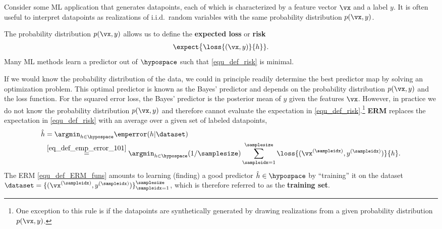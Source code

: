 \documentclass[12pt]{report}
\begin{document}
Consider some ML application that generates datapoints, each of 
which is characterized by a feature vector $\vx$ and a label $y$. It is 
often useful to interpret datapoints as realizations of i.i.d.\ random variables 
with the same probability distribution $p(\vx,y)$. 

The probability distribution $p(\vx,y)$ allows us to define the {\bf expected loss} or {\bf risk} 
\begin{equation}
\label{equ_def_risk} 
\expect \big \{ \loss{(\vx,y)}{h} \}.
\end{equation}
Many ML methods learn a predictor out of $\hypospace$ such 
that \eqref{equ_def_risk} is minimal. 

If we would know the probability distribution of the data, we could 
in principle readily determine the best predictor map by solving an 
optimization problem. This optimal predictor is known as the Bayes' 
predictor and depends on the probability distribution $p(\vx,y)$ 
and the loss function. For the squared error loss, the Bayes' 
predictor is the posterior mean of $y$ given the features $\vx$. 
However, in practice we do not know the probability distribution $p(\vx,y)$ 
and therefore cannot evaluate the expectation in \eqref{equ_def_risk}.\footnote{One exception to this rule is if 
the datapoints are synthetically generated by drawing realizations from a 
given probability distribution $p(\vx,y)$.} 
 {\bf ERM} replaces the expectation in  \eqref{equ_def_risk} with an average 
 over a given set of labeled datapoints,  
\begin{align}
\label{equ_def_ERM_funs}
   \hat{h} & = \argmin_{h \in \hypospace} \emperror(h|\dataset) \nonumber \\ 
   & \stackrel{\eqref{eq_def_emp_error_101}}{=}  \argmin_{h \in \hypospace} (1/\samplesize) \sum_{\sampleidx=1}^{\samplesize} \loss{(\vx^{(\sampleidx)},y^{(\sampleidx)})}{h}.
\end{align}
The ERM \eqref{equ_def_ERM_funs} amounts to learning (finding) a 
good predictor $\hat{h} \in \hypospace$ by ``training'' it on the 
dataset $\dataset = \{ (\vx^{(\sampleidx)},y^{(\sampleidx)}) \}_{\sampleidx=1}^{\samplesize}$, 
which is therefore referred to as the {\bf training set}. 
\end{document}
